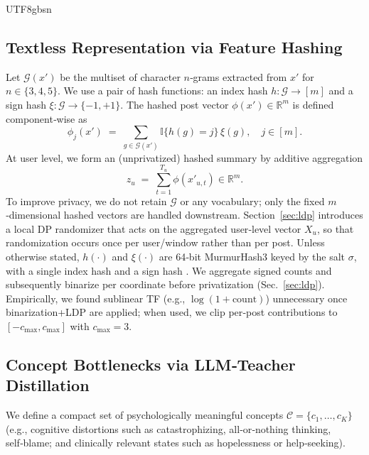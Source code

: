 \documentclass[lettersize,journal]{IEEEtran}
\begin{document}
\begin{CJK*}{UTF8}{gbsn}
\subsection{Textless Representation via Feature Hashing}
Let $\mathcal{G}(x')$ be the multiset of character $n$‑grams extracted from $x'$ for $n \in \{3,4,5\}$.
We use a pair of hash functions: an index hash $h: \mathcal{G} \to [m]$ and a sign hash $\xi: \mathcal{G} \to \{-1,+1\}$.
The hashed post vector $\phi(x') \in \mathbb{R}^{m}$ is defined component‑wise as
\begin{equation}
    \phi_j(x') \;=\; \sum_{g \in \mathcal{G}(x')} \mathbb{I}\{h(g)=j\}\,\xi(g),
    \quad j \in [m].
\end{equation}
At user level, we form an (unprivatized) hashed summary by additive aggregation
\begin{equation}
    z_u \;=\; \sum_{t=1}^{T_u} \phi(x'_{u,t}) \in \mathbb{R}^{m}.
\end{equation}
To improve privacy, we do not retain $\mathcal{G}$ or any vocabulary; only the fixed $m$‑dimensional hashed vectors are handled downstream. Section~\ref{sec:ldp} introduces a local DP randomizer that acts on the aggregated user‑level vector $X_u$, so that randomization occurs once per user/window rather than per post. Unless otherwise stated, $h(\cdot)$ and $\xi(\cdot)$ are 64‑bit MurmurHash3 keyed by the salt $\sigma$, with a single index hash and a sign hash \cite{weinberger2009featurehashing}. We aggregate signed counts and subsequently binarize per coordinate before privatization (Sec.~\ref{sec:ldp}). Empirically, we found sublinear TF (e.g., $\log(1+\mathrm{count})$) unnecessary once binarization+LDP are applied; when used, we clip per‑post contributions to $[-c_{\max},c_{\max}]$ with $c_{\max}=3$.

\subsection{Concept Bottlenecks via LLM‑Teacher Distillation}
\label{sec:concept}
We define a compact set of psychologically meaningful concepts $\mathcal{C}=\{c_1,\dots,c_{K}\}$ (e.g., cognitive distortions such as catastrophizing, all‑or‑nothing thinking, self‑blame; and clinically relevant states such as hopelessness or help‑seeking).


\end{CJK*}
\end{document}
